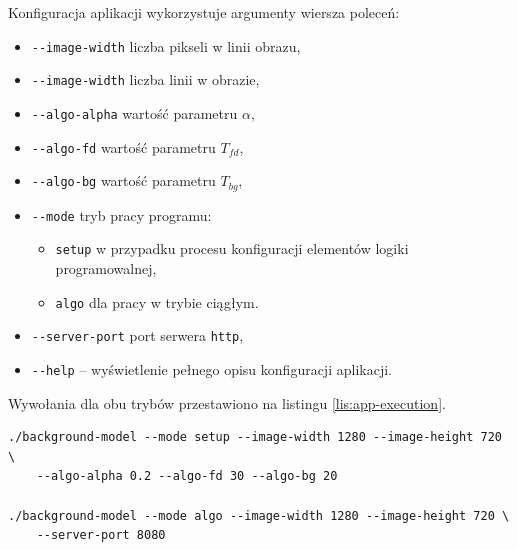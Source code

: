 Konfiguracja aplikacji wykorzystuje argumenty wiersza poleceń:
\begin{itemize}
		\item \texttt{\--\--image-width} liczba pikseli w linii obrazu,
		\item \texttt{\--\--image-width} liczba linii w obrazie,
		
		\item \texttt{\--\--algo-alpha} wartość parametru $\alpha$,
		\item \texttt{\--\--algo-fd} wartość parametru $T_{fd}$,
		\item \texttt{\--\--algo-bg} wartość parametru $T_{bg}$,
		
		
		\item \texttt{\--\--mode} tryb pracy programu: 
		\begin{itemize}
			\item \texttt{setup} w przypadku procesu konfiguracji elementów logiki programowalnej,
			\item \texttt{algo} dla pracy w trybie ciągłym.
		\end{itemize}
		
		\item \texttt{\--\--server-port} port serwera \texttt{http},
		
		\item \texttt{\--\--help} -- wyświetlenie pełnego opisu konfiguracji aplikacji.
\end{itemize}

Wywołania dla obu trybów przestawiono na listingu \ref{lis:app-execution}.

\begin{lstlisting}[breaklines, label=lis:app-execution, caption=Sposoby uruchomienia aplikacji.]
./background-model --mode setup --image-width 1280 --image-height 720 \
	--algo-alpha 0.2 --algo-fd 30 --algo-bg 20
	
./background-model --mode algo --image-width 1280 --image-height 720 \
	--server-port 8080
\end{lstlisting}